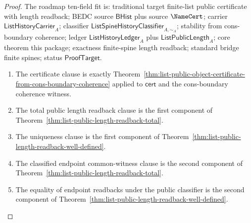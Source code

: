 \begin{proof}
The roadmap ten-field fit is: traditional target finite-list public certificate
with length readback; BEDC source $\mathsf{BHist}$ plus source $\NameCert$;
carrier $\mathsf{ListHistoryCarrier}_A$; classifier
$\mathsf{ListSpineHistoryClassifier}_{A,\sim_A}$; stability from
cons-boundary coherence; ledger $\mathsf{ListHistoryLedger}_A$ plus
$\mathsf{ListPublicLength}_A$; core theorem this package; exactness
finite-spine length readback; standard bridge finite spines; status
$\mathsf{ProofTarget}$.

\begin{enumerate}
  \item The certificate clause is exactly
  Theorem~\ref{thm:list-public-object-certificate-from-cons-boundary-coherence}
  applied to $\mathsf{cert}$ and the cons-boundary coherence witness.

  \item The total public length readback clause is the first component of
  Theorem~\ref{thm:list-public-length-readback-total}.

  \item The uniqueness clause is the first component of
  Theorem~\ref{thm:list-public-length-readback-well-defined}.

  \item The classified endpoint common-witness clause is the second component of
  Theorem~\ref{thm:list-public-length-readback-total}.

  \item The equality of endpoint readbacks under the public classifier is the
  second component of
  Theorem~\ref{thm:list-public-length-readback-well-defined}.
\end{enumerate}
\end{proof}

